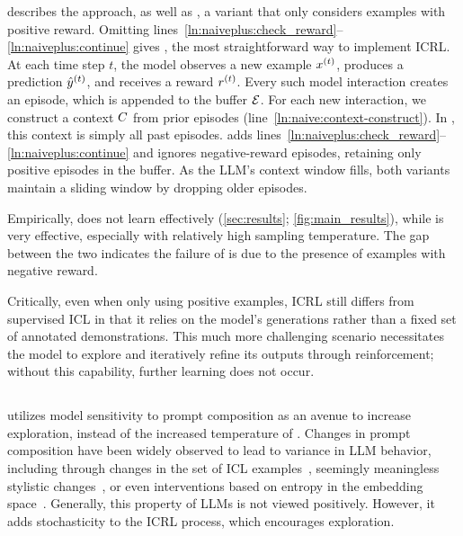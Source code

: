               

              





 describes the \naiveshort approach, as well as \naiveplusshort, a variant that only considers examples with positive reward. 
Omitting lines~\ref{ln:naiveplus:check_reward}--\ref{ln:naiveplus:continue} gives \naive, the most straightforward way to implement ICRL. 
At each time step $t$, the model observes a new example $x^{(t)}$, produces a prediction $\hat{y}^{(t)}$, and receives a reward $r^{(t)}$. 
Every such model interaction creates an episode, which is appended to the buffer $\mathcal{E}$. 
For each new interaction, we construct a context $C$ from prior episodes (line~\ref{ln:naive:context-construct}).  In \naiveshort, this context is simply all past episodes. 
\naiveplus adds lines~\ref{ln:naiveplus:check_reward}--\ref{ln:naiveplus:continue} and ignores negative-reward episodes, retaining only positive episodes in the buffer. As the LLM’s context window fills, both variants maintain a sliding window by dropping older episodes.




Empirically, \naiveshort does not learn effectively (\autoref{sec:results}; \autoref{fig:main_results}), while \naiveplusshort is very effective, especially with relatively high sampling temperature.
The gap between the two indicates the failure of \naiveshort is due to the presence of examples with negative reward. 



Critically, even when only using positive examples, ICRL still differs from supervised ICL in that it relies on the model's generations rather than a fixed set of annotated demonstrations. This much more challenging scenario necessitates the model to explore and iteratively refine its outputs through reinforcement; without this capability, further learning does not occur.



\subsection{\explorative}\label{sec:icrl:explorative}




\explorative utilizes model sensitivity to prompt composition as an avenue to increase exploration, instead of the increased temperature of \naiveshort. 
Changes in prompt composition have been widely observed to lead to variance in LLM behavior, including through changes in the set of ICL examples~\citep{zhang-etal-2022-active, liu-etal-2022-makes, chen-etal-2023-relation, levy2023diversedemonstrationsimproveincontext}, seemingly meaningless stylistic changes~\citep{sclar2024quantifying, lu-etal-2022-fantastically}, or even interventions based on entropy in the embedding space~\citep{rahn2024controllinglargelanguagemodel}. 
Generally, this property of LLMs is not viewed positively. 
However, it adds stochasticity to the ICRL process, which encourages exploration.

